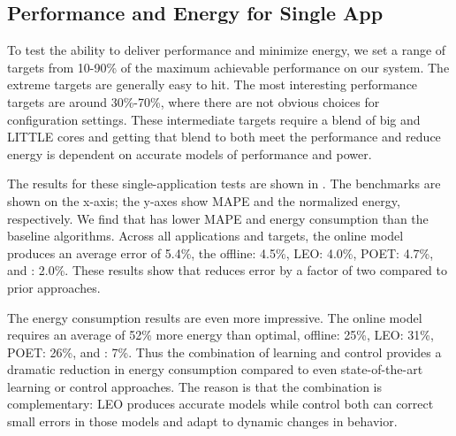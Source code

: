 \subsection{Performance and Energy for Single App}
To test the ability to deliver performance and minimize energy, we set
a range of targets from 10-90\% of the maximum achievable performance
on our system. The extreme targets are generally easy to hit. The most
interesting performance targets are around 30\%-70\%, where there are
not obvious choices for configuration settings. These intermediate
targets require a blend of big and LITTLE cores and getting that blend
to both meet the performance and reduce energy is dependent on
accurate models of performance and power.

The results for these single-application tests are shown in
.  The benchmarks are
shown on the x-axis; the y-axes show MAPE and the normalized energy,
respectively.  We find that \SYSTEM{} has lower MAPE and energy
consumption than the baseline algorithms. Across all applications and
targets, the online model produces an average error of 5.4\%, the
offline: 4.5\%, LEO: 4.0\%, POET: 4.7\%, and \SYSTEM{}: 2.0\%.  These
results show that \SYSTEM{} reduces error by a factor of two compared
to prior approaches.

The energy consumption results are even more impressive.  The online
model requires an average of 52\% more energy than optimal, offline:
25\%, LEO: 31\%, POET: 26\%, and \SYSTEM{}: 7\%.  Thus the combination
of learning and control provides a dramatic reduction in energy
consumption compared to even state-of-the-art learning or control
approaches.  The reason is that the combination is complementary: LEO
produces accurate models while control both can correct small errors
in those models and adapt to dynamic changes in behavior.



